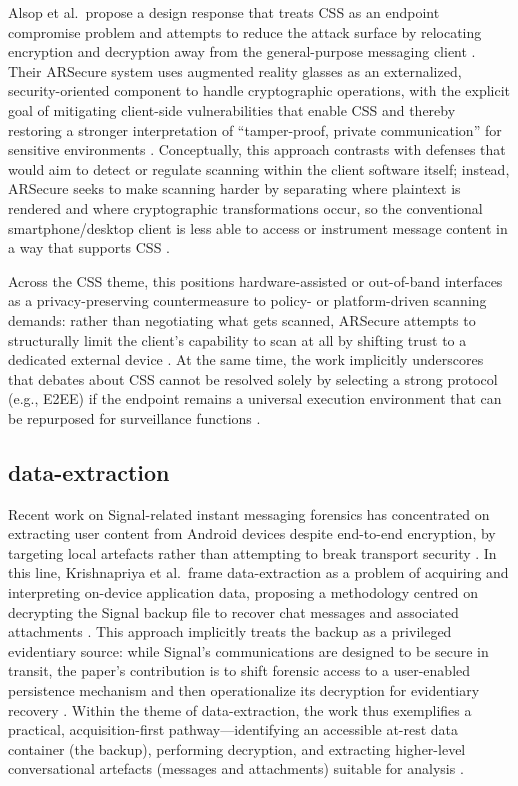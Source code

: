 Alsop et al.\ propose a design response that treats CSS as an endpoint compromise problem and attempts to reduce the attack surface by relocating encryption and decryption away from the general-purpose messaging client \cite{alsop2025}. Their ARSecure system uses augmented reality glasses as an externalized, security-oriented component to handle cryptographic operations, with the explicit goal of mitigating client-side vulnerabilities that enable CSS and thereby restoring a stronger interpretation of “tamper-proof, private communication” for sensitive environments \cite{alsop2025}. Conceptually, this approach contrasts with defenses that would aim to detect or regulate scanning within the client software itself; instead, ARSecure seeks to make scanning harder by separating where plaintext is rendered and where cryptographic transformations occur, so the conventional smartphone/desktop client is less able to access or instrument message content in a way that supports CSS \cite{alsop2025}. 

Across the CSS theme, this positions hardware-assisted or out-of-band interfaces as a privacy-preserving countermeasure to policy- or platform-driven scanning demands: rather than negotiating what gets scanned, ARSecure attempts to structurally limit the client’s capability to scan at all by shifting trust to a dedicated external device \cite{alsop2025}. At the same time, the work implicitly underscores that debates about CSS cannot be resolved solely by selecting a strong protocol (e.g., E2EE) if the endpoint remains a universal execution environment that can be repurposed for surveillance functions \cite{alsop2025}.

\subsection{data-extraction}
Recent work on Signal-related instant messaging forensics has concentrated on extracting user content from Android devices despite end-to-end encryption, by targeting local artefacts rather than attempting to break transport security \cite{krishnapriya2021}. In this line, Krishnapriya et al.\ frame data-extraction as a problem of acquiring and interpreting on-device application data, proposing a methodology centred on decrypting the Signal backup file to recover chat messages and associated attachments \cite{krishnapriya2021}. This approach implicitly treats the backup as a privileged evidentiary source: while Signal’s communications are designed to be secure in transit, the paper’s contribution is to shift forensic access to a user-enabled persistence mechanism and then operationalize its decryption for evidentiary recovery \cite{krishnapriya2021}. Within the theme of data-extraction, the work thus exemplifies a practical, acquisition-first pathway—identifying an accessible at-rest data container (the backup), performing decryption, and extracting higher-level conversational artefacts (messages and attachments) suitable for analysis \cite{krishnapriya2021}.


